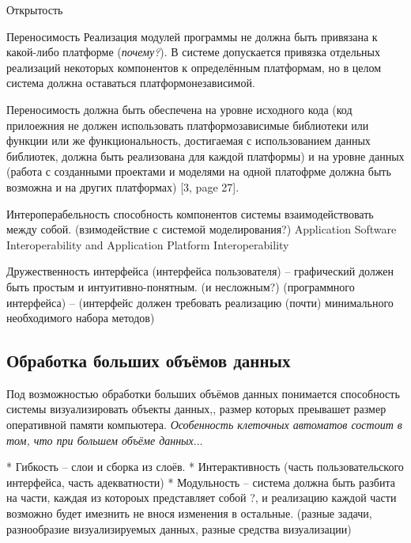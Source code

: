 \documentclass[a4paper,12pt]{extarticle}
\begin{document}
\begin{subsection}{Открытость}
    \begin{subsubsection}{Переносимость}
        Реализация модулей программы не должна быть привязана к какой-либо платформе (\textit{почему?}). В системе допускается привязка отдельных реализаций некоторых компонентов к определённым платформам, но в целом система должна оставаться платформонезависимой.
        
        Переносимость должна быть обеспечена на уровне исходного кода (код прилоежния не должен использовать платформозависимые библиотеки или функции или же функциональность, достигаемая с использованием данных библиотек, должна быть реализована для каждой платформы) и на уровне данных (работа с созданными проектами и моделями на одной платофрме должна быть возможна и на других платформах) [3, page 27].
    \end{subsubsection}
        
    \begin{subsubsection}{Интероперабельность}
        способность компонентов системы взаимодействовать между собой. (взимодействие с системой моделирования?)
        Application Software Interoperability and Application Platform Interoperability
    \end{subsubsection}
        
    \begin{subsubsection}{Дружественность интерфейса}
        (интерфейса пользователя) – графический должен быть простым и интуитивно-понятным. (и несложным?)
        (программного интерфейса) –  (интерфейс должен требовать реализацию (почти) минимального необходимого набора методов)
    \end{subsubsection}

\end{subsection}

\subsection{Обработка больших объёмов данных}
Под возможностью обработки больших объёмов данных понимается способность системы визуализировать объекты данных,, размер которых преывашет размер оперативной памяти компьютера. \textit{Особенность клеточных автоматов состоит в том, что при большем объёме данных}... 

* Гибкость -- слои и сборка из слоёв.
* Интерактивность (часть пользовательского интерфейса, часть адекватности)
* Модульность -- система должна быть разбита на части, каждая из котороых представляет собой ?, и реализацию каждой части возможно будет имезнить не внося изменения в остальные. (разные задачи, разнообразие визуализируемых данных, разные средства визуализации)
\end{document}
